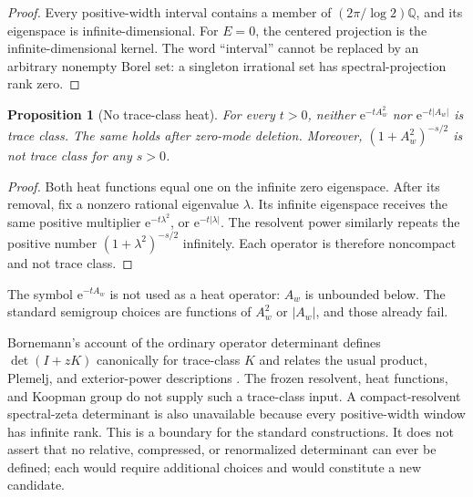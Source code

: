\documentclass[11pt]{article}
\newtheorem{proposition}[theorem]{Proposition}
\theoremstyle{definition}
\theoremstyle{remark}
\newcommand{\Q}{\mathbb{Q}}
\newcommand{\e}{\mathrm{e}}
\begin{document}
\begin{proof}
Every positive-width interval contains a member of
\((2\pi/\log2)\Q\), and its eigenspace is infinite-dimensional.  For
\(E=0\), the centered projection is the infinite-dimensional kernel.  The
word ``interval'' cannot be replaced by an arbitrary nonempty Borel set: a
singleton irrational set has spectral-projection rank zero.
\end{proof}

\begin{proposition}[No trace-class heat]
\label{prop:heat}
For every \(t>0\), neither \(\e^{-tA_w^2}\) nor \(\e^{-t|A_w|}\) is trace
class.  The same holds after zero-mode deletion.  Moreover,
\((1+A_w^2)^{-s/2}\) is not trace class for any \(s>0\).
\end{proposition}

\begin{proof}
Both heat functions equal one on the infinite zero eigenspace.  After its
removal, fix a nonzero rational eigenvalue \(\lambda\).  Its infinite
eigenspace receives the same positive multiplier \(\e^{-t\lambda^2}\), or
\(\e^{-t|\lambda|}\).  The resolvent power similarly repeats the positive
number \((1+\lambda^2)^{-s/2}\) infinitely.  Each operator is therefore
noncompact and not trace class.
\end{proof}

The symbol \(\e^{-tA_w}\) is not used as a heat operator: \(A_w\) is
unbounded below.  The standard semigroup choices are functions of \(A_w^2\)
or \(|A_w|\), and those already fail.

Bornemann's account of the ordinary operator determinant defines
\(\det(I+zK)\) canonically for trace-class \(K\) and relates the usual product,
Plemelj, and exterior-power descriptions \citep[Secs.~2--3]{Bornemann2010}.
The frozen resolvent, heat functions, and Koopman group do not supply such a
trace-class input.  A compact-resolvent spectral-zeta determinant is also
unavailable because every positive-width window has infinite rank.  This is
a boundary for the standard constructions.  It does not assert that no
relative, compressed, or renormalized determinant can ever be defined; each
would require additional choices and would constitute a new candidate.
\end{document}

